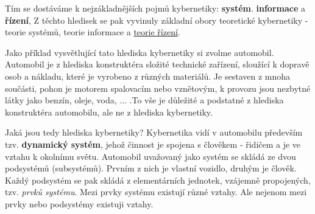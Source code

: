 {\begin{figure}[ht!]
        \caption*{ }
      \end{figure}
      
      Tím se dostáváme k nejzákladnějších pojmů kybernetiky: \textbf{systém}. \textbf{informace} a 
      \textbf{řízení}, Z těchto hledisek se pak vyvinuly základní obory teoretické kybernetiky - 
      teorie systémů, teorie informace a \hyperlink{tky:regulace}{teorie řízení}.
      
      Jako příklad vysvětlující tato hlediska kybernetiky si zvolme automobil. Automobil je z 
      hlediska konstruktéra složité technické zařízení, sloužící k dopravě osob a nákladu, které je 
      vyrobeno z různých materiálů. Je sestaven z mnoha součásti, pohon je motorem spalovacím nebo 
      vznětovým, k provozu jsou nezbytné látky jako benzín, oleje, voda, ... .To vše je důležité a 
      podstatné z hlediska konstruktéra automobilu, ale ne z hlediska kybernetiky.
      
      Jaká jsou tedy hlediska kybernetiky? Kybernetika vidí v automobilu především tzv. 
      \textbf{dynamický systém}, jehož činnost je spojena s člověkem - řidičem a je ve vztahu k 
      okolnímu světu. Automobil uvažovaný jako systém se skládá ze dvou podsystémů (subsystémů). 
      Prvním z nich je vlastní vozidlo, druhým je člověk. Každý podsystém se pak skládá z 
      elementárních jednotek, vzájemně propojených, tzv. \emph{prvků systému}. Mezi prvky systému 
      existují různé vztahy. Ale nejenom mezi prvky nebo podsystémy existuji vztahy.

}

